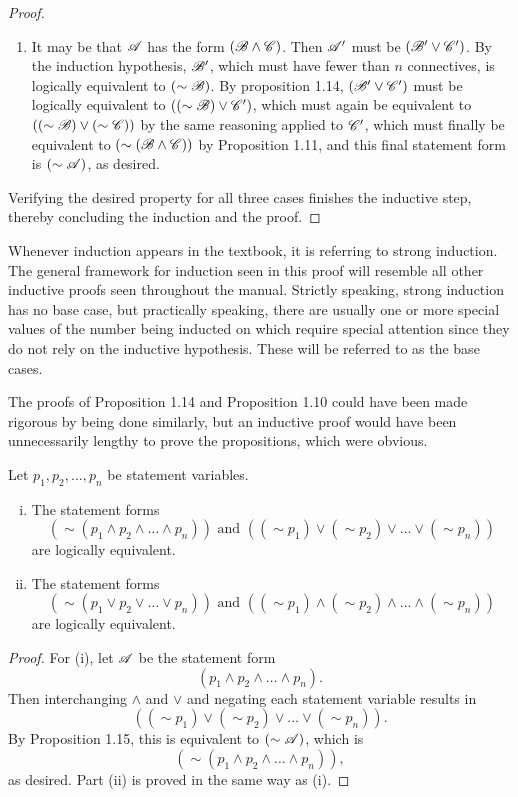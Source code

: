 \begin{proposition}
\begin{proof}
\begin{enumerate}
      \item It may be that \(\mathscr{A}\) has the form \((\mathscr{B} \land \mathscr{C})\). Then \(\mathscr{A}'\) must be \((\mathscr{B}' \lor \mathscr{C}')\). By the induction hypothesis, \(\mathscr{B}'\), which must have fewer than \(n\) connectives, is logically equivalent to \((\sim\mathscr{B})\). By proposition 1.14, \((\mathscr{B}' \lor \mathscr{C}')\) must be logically equivalent to \(((\sim\mathscr{B}) \lor \mathscr{C}')\), which must again be equivalent to \(((\sim\mathscr{B}) \lor (\sim\mathscr{C}))\) by the same reasoning applied to \(\mathscr{C}'\), which must finally be equivalent to \((\sim(\mathscr{B} \land \mathscr{C}))\) by Proposition 1.11, and this final statement form is \((\sim\mathscr{A})\), as desired.
    \end{enumerate}

    Verifying the desired property for all three cases finishes the inductive step, thereby concluding the induction and the proof.
  \end{proof}

  \note{} Whenever induction appears in the textbook, it is referring to strong induction. The general framework for induction seen in this proof will resemble all other inductive proofs seen throughout the manual. Strictly speaking, strong induction has no base case, but practically speaking, there are usually one or more special values of the number being inducted on which require special attention since they do not rely on the inductive hypothesis. These will be referred to as the base cases.

  \note{} The proofs of Proposition 1.14 and Proposition 1.10 could have been made rigorous by being done similarly, but an inductive proof would have been unnecessarily lengthy to prove the propositions, which were obvious.
\end{proposition}

\begin{corollary}
  Let \(p_1, p_2, \dots, p_n\) be statement variables.
  \begin{enumerate}[(i)]
    \item The statement forms
  \[(\sim(p_1 \land p_2 \land \dots \land p_n)) \text{ and } ((\sim p_1) \lor (\sim p_2) \lor \dots \lor (\sim p_n))\]
  are logically equivalent.

    \item The statement forms
  \[(\sim(p_1 \lor p_2 \lor \dots \lor p_n)) \text{ and } ((\sim p_1) \land (\sim p_2) \land \dots \land (\sim p_n))\]
  are logically equivalent.
  \end{enumerate}

  \begin{proof}
    For (i), let \(\mathscr{A}\) be the statement form
    \[(p_1 \land p_2 \land \dots \land p_n).\]
    Then interchanging \(\land\) and \(\lor\) and negating each statement variable results in
    \[((\sim p_1) \lor (\sim p_2) \lor \dots \lor (\sim p_n)).\]
    By Proposition 1.15, this is equivalent to \((\sim\mathscr{A})\), which is
    \[(\sim(p_1 \land p_2 \land \dots \land p_n)),\]
    as desired. Part (ii) is proved in the same way as (i).
  \end{proof}
\end{corollary}

